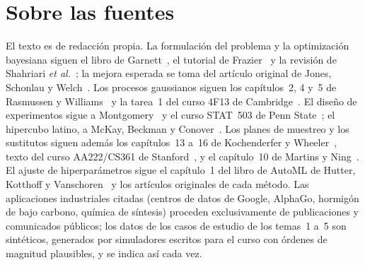 \documentclass[11pt,a4paper,twoside,openany]{book}
\begin{document}
\section*{Sobre las fuentes}
El texto es de redacción propia. La formulación del problema y la optimización bayesiana siguen el libro de Garnett~\cite{garnett}, el tutorial de Frazier~\cite{frazier} y la revisión de Shahriari \emph{et al.}~\cite{shahriari}; la mejora esperada se toma del artículo original de Jones, Schonlau y Welch~\cite{jones}. Los procesos gaussianos siguen los capítulos~2, 4 y~5 de Rasmussen y Williams~\cite{rw} y la tarea~1 del curso 4F13 de Cambridge~\cite{cam4f13}. El diseño de experimentos sigue a Montgomery~\cite{montgomery} y el curso STAT~503 de Penn State~\cite{psu503}; el hipercubo latino, a McKay, Beckman y Conover~\cite{mckay}. Los planes de muestreo y los sustitutos siguen además los capítulos~13 a~16 de Kochenderfer y Wheeler~\cite{kw}, texto del curso AA222/CS361 de Stanford~\cite{aa222}, y el capítulo~10 de Martins y Ning~\cite{mn}. El ajuste de hiperparámetros sigue el capítulo~1 del libro de AutoML de Hutter, Kotthoff y Vanschoren~\cite{feurer} y los artículos originales de cada método. Las aplicaciones industriales citadas (centros de datos de Google, AlphaGo, hormigón de bajo carbono, química de síntesis) proceden exclusivamente de publicaciones y comunicados públicos; los datos de los casos de estudio de los temas~1 a~5 son sintéticos, generados por simuladores escritos para el curso con órdenes de magnitud plausibles, y se indica así cada vez.
\end{document}
